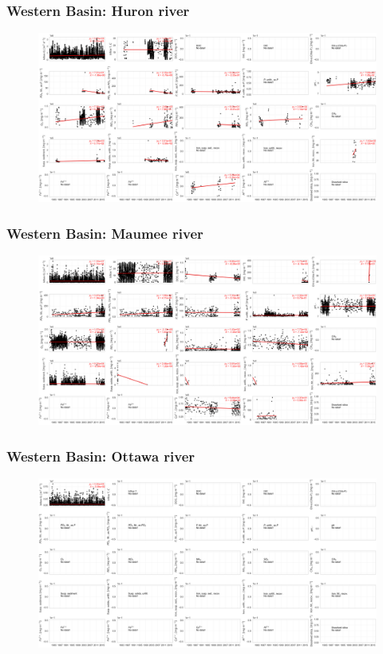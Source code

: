 \documentclass{beamer}
\begin{document}
\begin{frame}
\frametitle{Western Basin: Huron river}
\begin{figure}
\includegraphics[width=\textwidth]{rivers/Western basin/plot_all huronriver.png}
\end{figure}
\end{frame}


\begin{frame}
\frametitle{Western Basin: Maumee river}
\begin{figure}
\includegraphics[width=\textwidth]{rivers/Western basin/plot_all maumeeriver.png}
\end{figure}
\end{frame}


\begin{frame}
\frametitle{Western Basin: Ottawa river}
\begin{figure}
\includegraphics[width=\textwidth]{rivers/Western basin/plot_all ottawariver.png}
\end{figure}
\end{frame}
\end{document}
